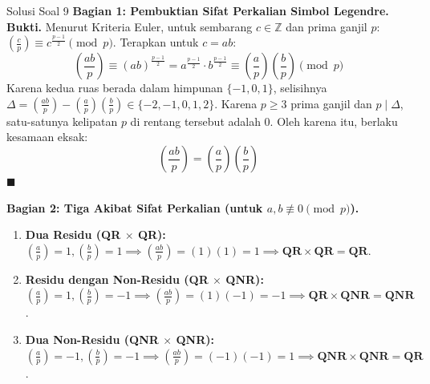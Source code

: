 \documentclass[11pt,a4paper]{article}
\newenvironment{proof}{\noindent\textbf{Bukti.}}{\hfill$\blacksquare$\vspace{0.2em}}
\begin{document}
\begin{solusibox}{Solusi Soal 9}
\textbf{Bagian 1: Pembuktian Sifat Perkalian Simbol Legendre.}
\begin{proof}
Menurut Kriteria Euler, untuk sembarang $c \in \mathbb{Z}$ dan prima ganjil $p$: $\left(\frac{c}{p}\right) \equiv c^{\frac{p-1}{2}} \pmod p$.  
Terapkan untuk $c = ab$:
\[
\left(\frac{ab}{p}\right) \equiv (ab)^{\frac{p-1}{2}} = a^{\frac{p-1}{2}} \cdot b^{\frac{p-1}{2}} \equiv \left(\frac{a}{p}\right)\left(\frac{b}{p}\right) \pmod p
\]
Karena kedua ruas berada dalam himpunan $\{-1, 0, 1\}$, selisihnya $\Delta = \left(\frac{ab}{p}\right) - \left(\frac{a}{p}\right)\left(\frac{b}{p}\right) \in \{-2, -1, 0, 1, 2\}$.  
Karena $p \ge 3$ prima ganjil dan $p \mid \Delta$, satu-satunya kelipatan $p$ di rentang tersebut adalah $0$.  
Oleh karena itu, berlaku kesamaan eksak:
\[
\left(\frac{ab}{p}\right) = \left(\frac{a}{p}\right)\left(\frac{b}{p}\right)
\]
\end{proof}

\textbf{Bagian 2: Tiga Akibat Sifat Perkalian (untuk $a, b \not\equiv 0 \pmod p$).}
\begin{enumerate}[leftmargin=*]
    \item \textbf{Dua Residu (QR $\times$ QR):} $\left(\frac{a}{p}\right) = 1, \left(\frac{b}{p}\right) = 1 \implies \left(\frac{ab}{p}\right) = (1)(1) = 1 \implies \mathbf{QR \times QR = QR}$.
    \item \textbf{Residu dengan Non-Residu (QR $\times$ QNR):} $\left(\frac{a}{p}\right) = 1, \left(\frac{b}{p}\right) = -1 \implies \left(\frac{ab}{p}\right) = (1)(-1) = -1 \implies \mathbf{QR \times QNR = QNR}$.
    \item \textbf{Dua Non-Residu (QNR $\times$ QNR):} $\left(\frac{a}{p}\right) = -1, \left(\frac{b}{p}\right) = -1 \implies \left(\frac{ab}{p}\right) = (-1)(-1) = 1 \implies \mathbf{QNR \times QNR = QR}$.
\end{enumerate}


\end{solusibox}
\end{document}
